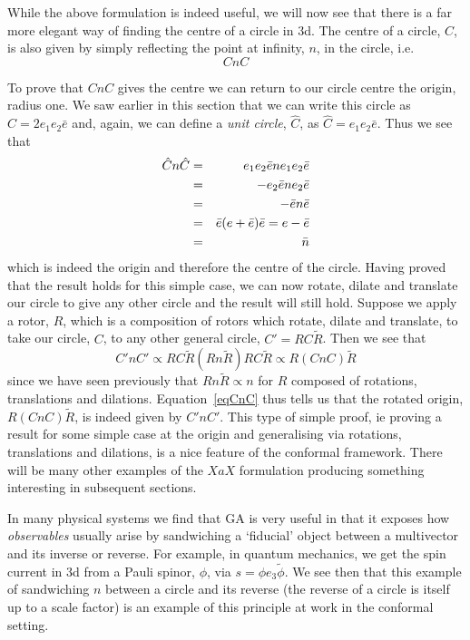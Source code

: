 While the above formulation is indeed useful, we will now see
that there is a far more elegant way of finding the
centre of a circle in 3d. The centre of a circle, $C$,  is also given 
by simply reflecting the point at infinity, $n$, in the
circle, i.e.
%
\begin{equation}
CnC
\end{equation}

To prove that $CnC$ gives the centre we can return to our circle
centre the origin, radius one. We saw earlier in this section that we can
write this circle as  $C= 2e_1e_2\bar{e}$ and, again, we can
define a \emph{unit circle}, $\hat{C}$, as $\hat{C}= e_1e_2\bar{e}$. 
Thus we see that
 \begin{eqnarray}
 \hat{C}n\hat{C} &  = &  e_1e_2\bar{e}ne_1e_2\bar{e} \nonumber \\
        & = &  -e_2\bar{e}n e_2 \bar{e} \nonumber \\
        & = &  -\bar{e}n\bar{e}  \nonumber \\
        & = & \bar{e}(e + \bar{e})\bar{e} = e - \bar{e} \nonumber
        \\
        & = &  \bar{n}
\end{eqnarray}
%
which is indeed the origin and therefore the centre of
the circle. Having proved that the result holds for this
simple case, we can now rotate, dilate and translate our
circle to give any other circle and the result will still
hold. Suppose we apply a rotor, $R$, which is a
composition of rotors which rotate, dilate and translate,
to take our circle, $C$, to any other general circle,
$C'=R C \tilde{R}$. Then we see that
%
\begin{equation}
C'nC' \propto RC\tilde{R}(Rn\tilde{R}) RC\tilde{R} \propto
R(CnC)\tilde{R} \label{eqCnC}
\end{equation}
%
since we have seen previously that $Rn\tilde{R} \propto n$ for $R$
composed of rotations, translations and dilations.
Equation~\ref{eqCnC} thus tells us that the rotated origin,
$R(CnC)\tilde{R}$, is indeed given by $C'nC'$. This type of simple
proof, ie proving a result for some simple case at the origin and
generalising via rotations, translations and dilations, is a nice
feature of the conformal framework. There will be many other examples
of the $XaX$ formulation producing something interesting in
subsequent sections.

In many physical systems we find that GA is very useful in that
it exposes how {\em observables} usually arise by sandwiching a
`fiducial' object between a multivector and its inverse or reverse.
For example, in quantum mechanics, we get the spin current in 3d
from a Pauli spinor, $\phi$, via $s = \phi e_3 \tilde{\phi}$. We see then
that this example of sandwiching $n$ between a circle and its
reverse (the reverse of a circle is itself up to a scale factor)
is an example of this principle at work in the conformal setting.

